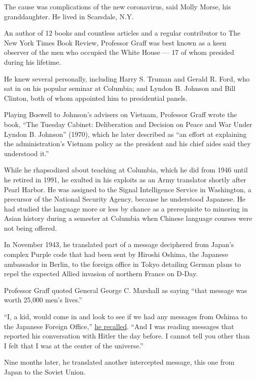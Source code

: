 The cause was complications of the new coronavirus, said Molly Morse,
his granddaughter. He lived in Scarsdale, N.Y.

An author of 12 books and countless articles and a regular contributor
to The New York Times Book Review, Professor Graff was best known as a
keen observer of the men who occupied the White House --- 17 of whom
presided during his lifetime.

He knew several personally, including Harry S. Truman and Gerald R.
Ford, who sat in on his popular seminar at Columbia; and Lyndon B.
Johnson and Bill Clinton, both of whom appointed him to presidential
panels.

Playing Boswell to Johnson's advisers on Vietnam, Professor Graff wrote
the book, ``The Tuesday Cabinet: Deliberation and Decision on Peace and
War Under Lyndon B. Johnson'' (1970), which he later described as ``an
effort at explaining the administration's Vietnam policy as the
president and his chief aides said they understood it.''

While he rhapsodized about teaching at Columbia, which he did from 1946
until he retired in 1991, he exulted in his exploits as an Army
translator shortly after Pearl Harbor. He was assigned to the Signal
Intelligence Service in Washington, a precursor of the National Security
Agency, because he understood Japanese. He had studied the language more
or less by chance as a prerequisite to minoring in Asian history during
a semester at Columbia when Chinese language courses were not being
offered.

In November 1943, he translated part of a message deciphered from
Japan's complex Purple code that had been sent by Hiroshi Oshima, the
Japanese ambassador in Berlin, to the foreign office in Tokyo detailing
German plans to repel the expected Allied invasion of northern France on
D-Day.

Professor Graff quoted General George C. Marshall as saying ``that
message was worth 25,000 men's lives.''

``I, a kid, would come in and look to see if we had any messages from
Oshima to the Japanese Foreign Office,''
\href{https://www.oldnewyorkstories.com/post/11670862477/henry-graff}{he
recalled}. ``And I was reading messages that reported his conversation
with Hitler the day before. I cannot tell you other than I felt that I
was at the center of the universe.''

Nine months later, he translated another intercepted message, this one
from Japan to the Soviet Union.

